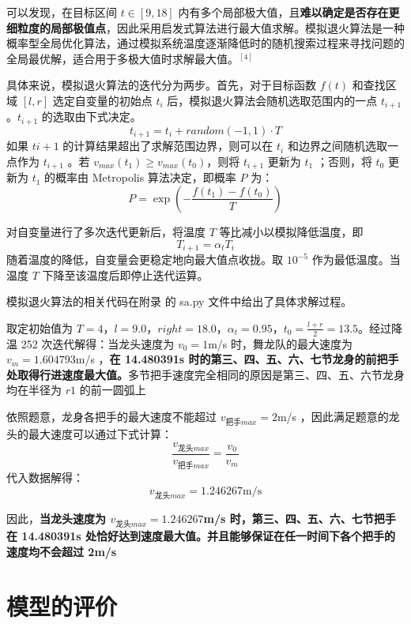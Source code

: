 \documentclass[a4paper]{article}
\begin{document}
		可以发现，在目标区间 $t \in [9, 18]$ 内有多个局部极大值，且\textbf{难以确定是否存在更细粒度的局部极值点}，因此采用启发式算法进行最大值求解。模拟退火算法是一种概率型全局优化算法，通过模拟系统温度逐渐降低时的随机搜索过程来寻找问题的全局最优解，适合用于多极大值时求解最大值。$^{[4]}$
		
		具体来说，模拟退火算法的迭代分为两步。首先，对于目标函数 $f(t)$ 和查找区域 $[l, r]$ 选定自变量的初始点 $t_i$ 后，模拟退火算法会随机选取范围内的一点 $t_{i+1}$ 。$t_{i+1}$ 的选取由下式决定。
		\begin{equation}
			t_{i+1} = t_i + random(-1, 1) \cdot T
		\end{equation}
		如果 $t{i+1}$ 的计算结果超出了求解范围边界，则可以在 $t_i$ 和边界之间随机选取一点作为 $t_{i+1}$ 。若 $v_{max}(t_1) \ge v_{max}(t_0)$，则将 $t_{i+1}$ 更新为 $t_1$ ；否则，将 $t_0$ 更新为 $t_1$ 的概率由 Metropolis 算法决定，即概率 $P$ 为：
		\begin{equation}
			P = \exp(-\dfrac{f(t_1) - f(t_0)}{T})
		\end{equation}
		
		对自变量进行了多次迭代更新后，将温度 $T$ 等比减小以模拟降低温度，即
		$$T_{i+1} = \alpha_t T_i$$
		随着温度的降低，自变量会更稳定地向最大值点收拢。取 $10^{-5}$ 作为最低温度。当温度 $T$ 下降至该温度后即停止迭代运算。
		
		模拟退火算法的相关代码在附录%
		的 sa.py 文件中给出了具体求解过程。
		
		取定初始值为 $T = 4$，$l=9.0$，$right=18.0$，$\alpha_t = 0.95$，$t_0 = \frac{l + r}{2} = 13.5$。经过降温 252 次迭代解得：当龙头速度为 $v_0 = 1$m/s 时，舞龙队的最大速度为 $v_m = 1.604793$m/s ，\textbf{在 14.480391s 时的第三、四、五、六、七节龙身的前把手处取得行进速度最大值。}多节把手速度完全相同的原因是第三、四、五、六节龙身均在半径为 $r1$ 的前一圆弧上
		
		依照题意，龙身各把手的最大速度不能超过 $v_{\text{把手}max} = 2$m/s ，因此满足题意的龙头的最大速度可以通过下式计算：
		$$ \dfrac{v_{\text{龙头}max}}{v_{\text{把手}max}} = \dfrac{v_0}{v_m} $$
		代入数据解得：
		\begin{equation}
			v_{\text{龙头}max} = 1.246267 \text{m/s}
		\end{equation}
		
		因此，\textbf{当龙头速度为 $v_{\text{龙头}max}= 1.246267$m/s 时，第三、四、五、六、七节把手在 14.480391s 处恰好达到速度最大值。并且能够保证在任一时间下各个把手的速度均不会超过 2m/s}
		
		
	\section{模型的评价}
\end{document}
